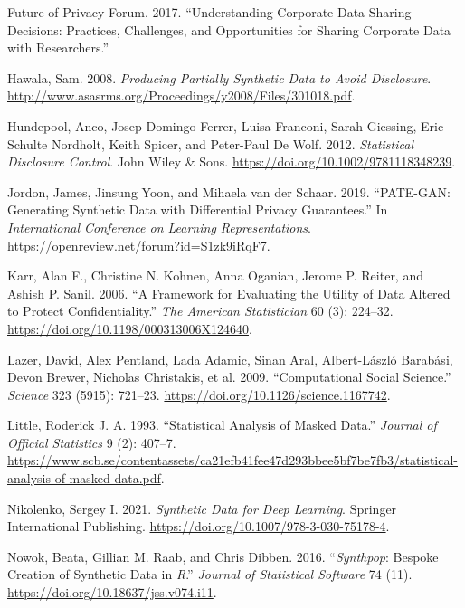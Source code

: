 \documentclass[
]{article}
\newlength{\cslhangindent}
\newlength{\cslentryspacingunit} %
\newenvironment{CSLReferences}[2] %
 {%
  \setlength{\parindent}{0pt}
  \ifodd #1
  \let\oldpar\par
  \def\par{\hangindent=\cslhangindent\oldpar}
  \fi
  \setlength{\parskip}{#2\cslentryspacingunit}
 }%
 {}
\begin{document}
\begin{CSLReferences}{1}{0}
\leavevmode{}%
Future of Privacy Forum. 2017. {``Understanding Corporate Data Sharing
Decisions: Practices, Challenges, and Opportunities for Sharing
Corporate Data with Researchers.''}

\leavevmode{}%
Hawala, Sam. 2008. \emph{Producing Partially Synthetic Data to Avoid
Disclosure}.
\url{http://www.asasrms.org/Proceedings/y2008/Files/301018.pdf}.

\leavevmode{}%
Hundepool, Anco, Josep Domingo-Ferrer, Luisa Franconi, Sarah Giessing,
Eric Schulte Nordholt, Keith Spicer, and Peter-Paul De Wolf. 2012.
\emph{Statistical Disclosure Control}. John Wiley \& Sons.
\url{https://doi.org/10.1002/9781118348239}.

\leavevmode{}%
Jordon, James, Jinsung Yoon, and Mihaela van der Schaar. 2019.
{``{PATE}-{GAN}: Generating Synthetic Data with Differential Privacy
Guarantees.''} In \emph{International Conference on Learning
Representations}. \url{https://openreview.net/forum?id=S1zk9iRqF7}.

\leavevmode{}%
Karr, Alan F., Christine N. Kohnen, Anna Oganian, Jerome P. Reiter, and
Ashish P. Sanil. 2006. {``A Framework for Evaluating the Utility of Data
Altered to Protect Confidentiality.''} \emph{The American Statistician}
60 (3): 224--32. \url{https://doi.org/10.1198/000313006X124640}.

\leavevmode{}%
Lazer, David, Alex Pentland, Lada Adamic, Sinan Aral, Albert-László
Barabási, Devon Brewer, Nicholas Christakis, et al. 2009.
{``Computational Social Science.''} \emph{Science} 323 (5915): 721--23.
\url{https://doi.org/10.1126/science.1167742}.

\leavevmode{}%
Little, Roderick J. A. 1993. {``Statistical Analysis of Masked Data.''}
\emph{Journal of Official Statistics} 9 (2): 407--7.
\url{https://www.scb.se/contentassets/ca21efb41fee47d293bbee5bf7be7fb3/statistical-analysis-of-masked-data.pdf}.

\leavevmode{}%
Nikolenko, Sergey I. 2021. \emph{Synthetic Data for Deep Learning}.
Springer International Publishing.
\url{https://doi.org/10.1007/978-3-030-75178-4}.

\leavevmode{}%
Nowok, Beata, Gillian M. Raab, and Chris Dibben. 2016.
{``{\emph{Synthpop}:} Bespoke Creation of Synthetic Data in
{\emph{R}}.''} \emph{Journal of Statistical Software} 74 (11).
\url{https://doi.org/10.18637/jss.v074.i11}.


\end{CSLReferences}
\end{document}
